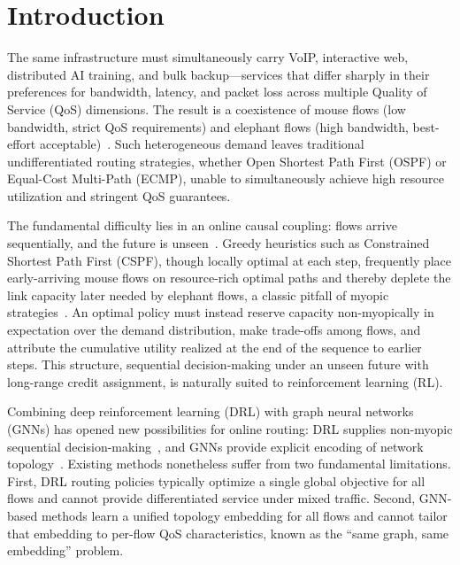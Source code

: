\section{Introduction}
\label{sec:intro}

The same infrastructure must simultaneously carry VoIP, interactive web, distributed 
AI training, and bulk backup—services that differ sharply in their preferences for 
bandwidth, latency, and packet loss across multiple Quality of Service (QoS) dimensions. The result is a coexistence of mouse flows (low bandwidth, strict QoS requirements) and elephant flows (high bandwidth, best-effort acceptable)~\cite{CISCO2023_GlobalTraffic}. Such heterogeneous demand leaves traditional undifferentiated routing strategies, whether Open Shortest Path First (OSPF) or Equal-Cost Multi-Path (ECMP), unable to simultaneously achieve high resource utilization and stringent QoS guarantees.

The fundamental difficulty lies in an online causal coupling: flows arrive sequentially, and the future is unseen~\cite{Karp1992_OnlineVsOffline}. 
Greedy heuristics such as Constrained Shortest Path First (CSPF), though locally optimal at each step, frequently place early-arriving mouse flows on resource-rich optimal paths and thereby deplete the link capacity later needed by elephant flows, a classic pitfall of myopic strategies~\cite{Fortz2000_TrafficEngineering}. An optimal policy must instead reserve capacity non-myopically in expectation over the demand distribution, make trade-offs among flows, and attribute the cumulative utility realized at the end of the sequence to earlier steps. This structure, sequential decision-making under an unseen future with long-range credit assignment, is naturally suited to reinforcement learning (RL).

Combining deep reinforcement learning (DRL) with graph neural networks (GNNs) has opened new possibilities for online routing: DRL supplies non-myopic sequential decision-making~\cite{Sun2022_ScalableRouting_TON,He2024_RoutingOptimization_TMC}, and GNNs provide explicit encoding of network topology~\cite{Rusek2020_JSAC_RouteNet,FerriolGalmes_2023_RouteNetFermi,Munikoti2024_DRL_GNN_TNNLS}. Existing methods nonetheless suffer from two fundamental limitations. First, DRL routing policies typically optimize a single global objective for all flows and cannot provide differentiated service under mixed traffic. Second, GNN-based methods learn a unified topology embedding for all flows and cannot tailor that embedding to per-flow QoS characteristics, known as the ``same graph, same embedding'' problem.

